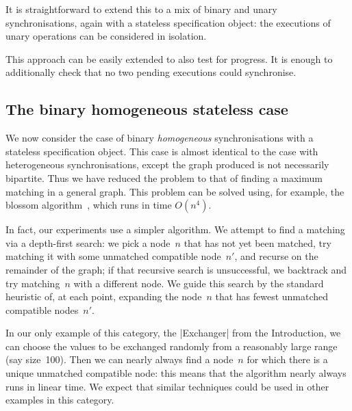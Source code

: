It is straightforward to extend this to a mix of binary and unary
synchronisations, again with a stateless specification object: the executions
of unary operations can be considered in isolation.  

This approach can be easily extended to also test for progress.  It is enough
to additionally check that no two pending executions could synchronise.


\subsection{The binary homogeneous stateless case}
\label{sec:binary-homogeneous} 

We now consider the case of binary \emph{homogeneous} synchronisations with a
stateless specification object.  This case is almost identical to the case
with heterogeneous synchronisations, except the graph produced is not
necessarily bipartite.  Thus we have reduced the problem to that of finding a
maximum matching in a general graph.  This problem can be solved using, for
example, the blossom algorithm~\cite{edmonds_1965}, which runs in time
$O(n^4)$.
  


In fact, our experiments use a simpler algorithm.  We attempt to find a
matching via a depth-first search: we pick a node~$n$ that has not yet been
matched, try matching it with some unmatched compatible node~$n'$, and recurse
on the remainder of the graph; if that recursive search is unsuccessful, we
backtrack and try matching~$n$ with a different node.  We guide this search by
the standard heuristic of, at each point, expanding the node~$n$ that has
fewest unmatched compatible nodes~$n'$.  

In our only example of this category, the |Exchanger| from the Introduction,
we can choose the values to be exchanged randomly from a reasonably large
range (say size~100).  Then we can nearly always find a node~$n$ for which
there is a unique unmatched compatible node: this means that the algorithm
nearly always runs in linear time.  We expect that similar techniques could be
used in other examples in this category.


